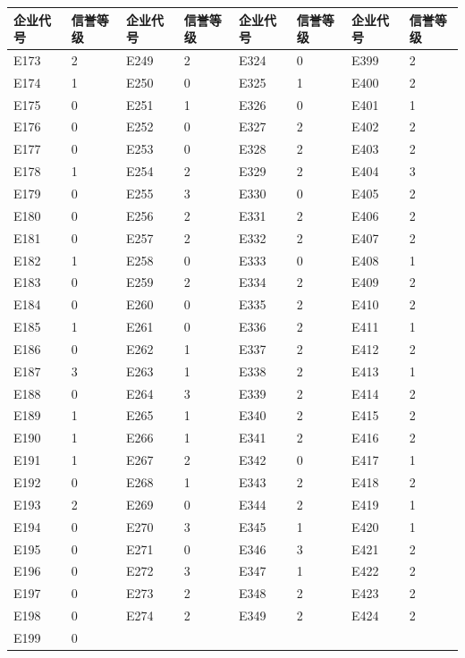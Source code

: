 \documentclass[UTF8]{ctexart}
\begin{document}
	\begin{table}[H]
		\centering
		\begin{tabular}{|l|l|l|l|l|l|l|l|}
		\hline
			企业代号 & 信誉等级 & 企业代号 & 信誉等级 & 企业代号 & 信誉等级 & 企业代号 & 信誉等级 \\ \hline
			E173 & 2 & E249 & 2 & E324 & 0 & E399 & 2 \\ \hline
			E174 & 1 & E250 & 0 & E325 & 1 & E400 & 2 \\ \hline
			E175 & 0 & E251 & 1 & E326 & 0 & E401 & 1 \\ \hline
			E176 & 0 & E252 & 0 & E327 & 2 & E402 & 2 \\ \hline
			E177 & 0 & E253 & 0 & E328 & 2 & E403 & 2 \\ \hline
			E178 & 1 & E254 & 2 & E329 & 2 & E404 & 3 \\ \hline
			E179 & 0 & E255 & 3 & E330 & 0 & E405 & 2 \\ \hline
			E180 & 0 & E256 & 2 & E331 & 2 & E406 & 2 \\ \hline
			E181 & 0 & E257 & 2 & E332 & 2 & E407 & 2 \\ \hline
			E182 & 1 & E258 & 0 & E333 & 0 & E408 & 1 \\ \hline
			E183 & 0 & E259 & 2 & E334 & 2 & E409 & 2 \\ \hline
			E184 & 0 & E260 & 0 & E335 & 2 & E410 & 2 \\ \hline
			E185 & 1 & E261 & 0 & E336 & 2 & E411 & 1 \\ \hline
			E186 & 0 & E262 & 1 & E337 & 2 & E412 & 2 \\ \hline
			E187 & 3 & E263 & 1 & E338 & 2 & E413 & 1 \\ \hline
			E188 & 0 & E264 & 3 & E339 & 2 & E414 & 2 \\ \hline
			E189 & 1 & E265 & 1 & E340 & 2 & E415 & 2 \\ \hline
			E190 & 1 & E266 & 1 & E341 & 2 & E416 & 2 \\ \hline
			E191 & 1 & E267 & 2 & E342 & 0 & E417 & 1 \\ \hline
			E192 & 0 & E268 & 1 & E343 & 2 & E418 & 2 \\ \hline
			E193 & 2 & E269 & 0 & E344 & 2 & E419 & 1 \\ \hline
			E194 & 0 & E270 & 3 & E345 & 1 & E420 & 1 \\ \hline
			E195 & 0 & E271 & 0 & E346 & 3 & E421 & 2 \\ \hline
			E196 & 0 & E272 & 3 & E347 & 1 & E422 & 2 \\ \hline
			E197 & 0 & E273 & 2 & E348 & 2 & E423 & 2 \\ \hline
			E198 & 0 & E274 & 2 & E349 & 2 & E424 & 2 \\ \hline
			E199 & 0 &      &   &      &   &      &    \\ \hline
		\end{tabular}
	\end{table}
	
\end{document}
